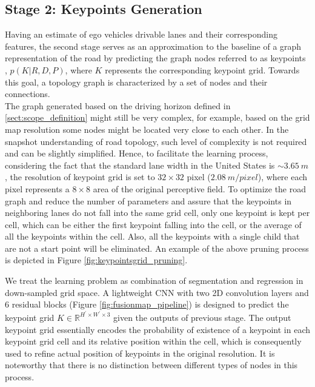 \documentclass[10pt,twocolumn,letterpaper]{article}
\begin{document}
\subsection{Stage 2: Keypoints Generation}
\label{sect:road_graph_generation}
Having an estimate of ego vehicle\textquotesingle s drivable lanes and their corresponding features, the second stage serves as an approximation to the baseline of a graph representation of the road by predicting the graph nodes referred to as keypoints , $p(K | R, D, P)$, where $K$ represents the corresponding keypoint grid. Towards this goal, a topology graph is characterized by a set of nodes and their connections.\\
The graph generated based on the driving horizon defined in \ref{sect:scope_definition} might still be very complex, for example, based on the grid map resolution some nodes might be located very close to each other. In the snapshot understanding of road topology, such level of complexity is not required and can be slightly simplified. Hence, to facilitate the learning process, considering the fact that the standard lane width in the United States is $\sim 3.65\:m$, the resolution of keypoint grid is set to $32\times 32$ pixel ($2.08\:m/pixel$), where each pixel represents a $8\times 8$ area of the original perceptive field. To optimize the road graph and reduce the number of parameters and assure that the keypoints in neighboring lanes do not fall into the same grid cell, only one keypoint is kept per cell, which can be either the first keypoint falling into the cell, or the average of all the keypoints within the cell. Also, all the keypoints with a single child that are not a start point will be eliminated. An example of the above pruning process is depicted in Figure \ref{fig:keypointsgrid_pruning}. 

We treat the learning problem as combination of segmentation and regression in down-sampled grid space. A lightweight CNN with two 2D convolution layers and 6 residual blocks (Figure \ref{fig:fusionmap_pipeline}) is designed to predict the keypoint grid $K \in \mathbb{R}^{H^\prime \times W^\prime \times 3}$ given the outputs of previous stage. The output keypoint grid essentially encodes the probability of existence of a keypoint in each keypoint grid cell and its relative position within the cell, which is consequently used to refine actual position of keypoints in the original resolution. It is noteworthy that there is no distinction between different types of nodes in this process. 
\end{document}
